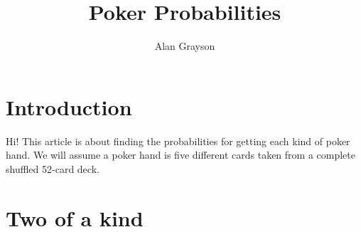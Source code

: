 \documentclass[12pt]{article}
\begin{document}
\title{Poker Probabilities}
\author{Alan Grayson}
\maketitle
\section*{Introduction}
Hi! This article is about finding the probabilities for getting each kind of poker hand. 
We will assume a poker hand is five different cards taken from a complete shuffled 52-card deck. 
\section{Two of a kind}
\end{document}
